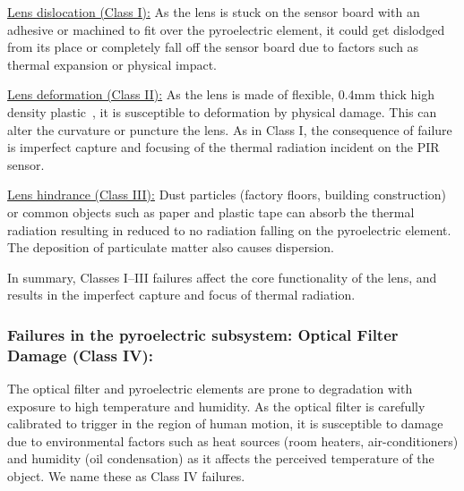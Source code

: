 \noindent \underline{Lens dislocation (Class I):} %
As the lens is stuck on the sensor board with an adhesive or machined to fit over the pyroelectric element, it could get dislodged from its place or completely fall off the sensor board due to factors such as thermal expansion or physical impact. 

\noindent \underline{Lens deformation (Class II):} As the lens is made of flexible, 0.4mm thick high density plastic~\cite{fresnel}, it is susceptible to deformation by physical damage. This can alter the curvature or puncture the lens. %
%
As in Class I, the consequence of failure is imperfect capture and focusing of the thermal radiation incident on the PIR sensor.
%

\noindent \underline{Lens hindrance (Class III):} Dust particles (\eg factory floors, building construction) or common objects such as paper and plastic tape can absorb the thermal radiation resulting in reduced to no radiation falling on the pyroelectric element. The deposition of particulate matter also causes dispersion.

In summary, Classes I--III failures affect the core functionality of the lens, and results in the imperfect capture and focus of thermal radiation.

\subsubsection{\textbf{Failures in the pyroelectric subsystem}: Optical Filter Damage (Class IV):} %
The optical filter and pyroelectric elements are prone to degradation with exposure to high temperature and humidity. As the optical filter is carefully calibrated to trigger in the region of human motion, it is susceptible to damage due to environmental factors such as heat sources (\eg room heaters, air-conditioners) and humidity (\eg oil condensation) as it affects the perceived temperature of the object. We name these as Class IV failures.

